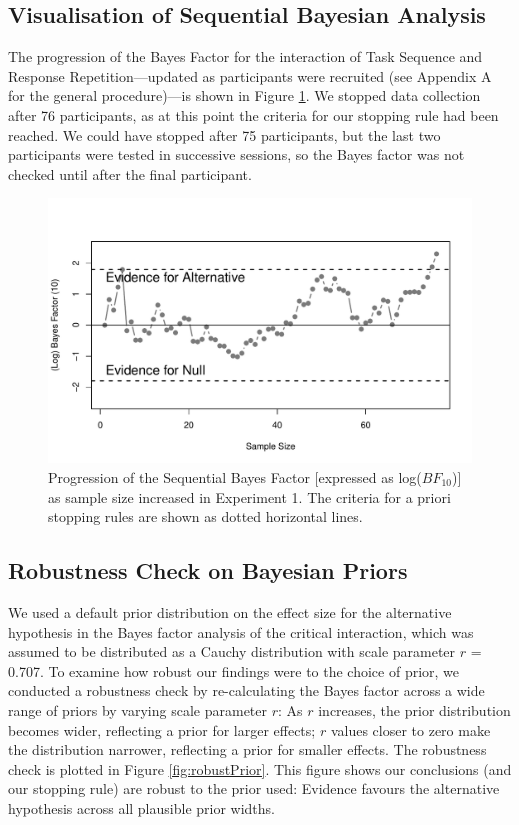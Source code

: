 \documentclass[a4paper, doc, natbib]{apa6}
\begin{document}
\subsection{Visualisation of Sequential Bayesian Analysis} 
The progression of the Bayes Factor for the interaction of Task Sequence and Response Repetition---updated as participants were recruited (see Appendix A for the general procedure)---is shown in Figure \ref{fig:bayesFactor}. We stopped data collection after 76 participants, as at this point the criteria for our stopping rule had been reached. We could have stopped after 75 participants, but the last two participants were tested in successive sessions, so the Bayes factor was not checked until after the final participant. 

\begin{figure}
\begin{center}
\includegraphics[width = \textwidth]{Images/bayesFactor.pdf}
\caption{Progression of the Sequential Bayes Factor [expressed as log($BF_{10}$)] as sample size increased in Experiment 1. The criteria for a priori stopping rules are shown as dotted horizontal lines.}
\label{fig:bayesFactor}
\end{center}
\end{figure}

\subsection{Robustness Check on Bayesian Priors}
We used a default prior distribution on the effect size for the alternative hypothesis in the Bayes factor analysis of the critical interaction, which was assumed to be distributed as a Cauchy distribution with scale parameter $r$ = 0.707. To examine how robust our findings were to the choice of prior, we conducted a robustness check by re-calculating the Bayes factor across a wide range of priors by varying scale parameter $r$: As $r$ increases, the prior distribution becomes wider, reflecting a prior for larger effects; $r$ values closer to zero make the distribution narrower, reflecting a prior for smaller effects. The robustness check is plotted in Figure \ref{fig:robustPrior}. This figure shows our conclusions (and our stopping rule) are robust to the prior used: Evidence favours the alternative hypothesis across all plausible prior widths.
\end{document}
